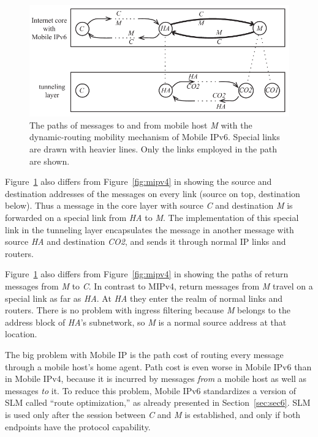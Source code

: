 \begin{figure}
\centering
\includegraphics[scale=1.00]{figures/mipv6drm.pdf}
\caption{The paths of messages to and from mobile host {\it M} with
the dynamic-routing mobility mechanism of Mobile IPv6.
Special links are drawn with heavier lines.
Only the links employed in the path are shown.}
\label{fig:mipv6drm}
\end{figure}

Figure~\ref{fig:mipv6drm} also differs from Figure~\ref{fig:mipv4}
in showing the source and destination addresses of the messages on
every link (source on top, destination below).
Thus a message in the core layer with source {\it C} and
destination {\it M} is forwarded on a special link from {\it HA} to
{\it M}.
The implementation of this special link in the tunneling layer 
encapsulates the message in another message with source {\it HA}
and destination {\it CO2}, and sends it through normal IP links and
routers.

Figure~\ref{fig:mipv6drm} also differs from Figure~\ref{fig:mipv4}
in showing the paths of return messages from {\it M} to {\it C}.
In contrast to MIPv4, return messages from {\it M} travel on a
special link as far as {\it HA}.
At {\it HA} they enter the realm of normal links and routers.
There is no problem with ingress filtering because {\it M} belongs to
the address block of {\it HA}'s subnetwork, so {\it M} is a normal
source address at that location. 

The big problem with Mobile IP is the path cost of routing every
message through a mobile host's home agent.
Path cost is even worse in Mobile IPv6 than in Mobile IPv4, because
it is incurred by messages {\it from} a mobile host as well as
messages {\it to} it.
To reduce this problem, Mobile IPv6 standardizes a version of
SLM called ``route optimization,'' as already presented in
Section~\ref{sec:sec6}.
SLM is used only after the session between {\it C} and {\it M}
is established, and only if both endpoints have the protocol capability.


